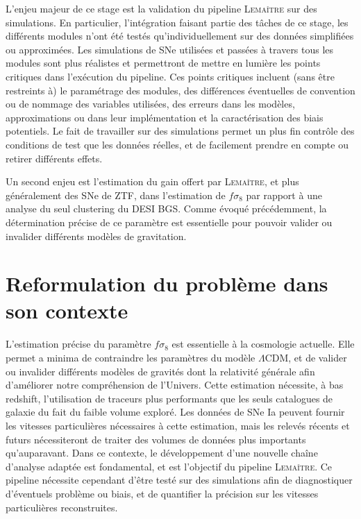 \documentclass{book}
\def\lemaitre{\textsc{Lemaître}\xspace}
\begin{document}
L'enjeu majeur de ce stage est la validation du pipeline \lemaitre sur des simulations. En particulier, l'intégration faisant partie des tâches de ce stage, les différents modules n'ont été testés qu'individuellement sur des données simplifiées ou approximées. Les simulations de SNe utilisées et passées à travers tous les modules sont plus réalistes et permettront de mettre en lumière les points critiques dans l'exécution du pipeline. Ces points critiques incluent (sans être restreints à) le paramétrage des modules, des différences éventuelles de convention ou de nommage des variables utilisées, des erreurs dans les modèles, approximations ou dans leur implémentation et la caractérisation des biais potentiels.
Le fait de travailler sur des simulations permet un plus fin contrôle des conditions de test que les données réelles, et de facilement prendre en compte ou retirer différents effets.

Un second enjeu est l'estimation du gain offert par \lemaitre, et plus généralement des SNe de ZTF, dans l'estimation de $f\sigma_8$ par rapport à une analyse du seul clustering du DESI BGS. Comme évoqué précédemment, la détermination précise de ce paramètre est essentielle pour pouvoir valider ou invalider différents modèles de gravitation.

\section{Reformulation du problème dans son contexte}

L'estimation précise du paramètre $f\sigma_8$ est essentielle à la cosmologie actuelle. Elle permet a minima de contraindre les paramètres du modèle $\Lambda$CDM, et de valider ou invalider différents modèles de gravités dont la relativité générale afin d'améliorer notre compréhension de l'Univers. Cette estimation nécessite, à bas redshift, l'utilisation de traceurs plus performants que les seuls catalogues de galaxie du fait du faible volume exploré. Les données de SNe Ia peuvent fournir les vitesses particulières nécessaires à cette estimation, mais les relevés récents et futurs nécessiteront de traiter des volumes de données plus importants qu'auparavant. Dans ce contexte, le développement d'une nouvelle chaîne d'analyse adaptée est fondamental, et est l'objectif du pipeline \lemaitre. Ce pipeline nécessite cependant d'être testé sur des simulations afin de diagnostiquer d'éventuels problème ou biais, et de quantifier la précision sur les vitesses particulières reconstruites.
\end{document}
